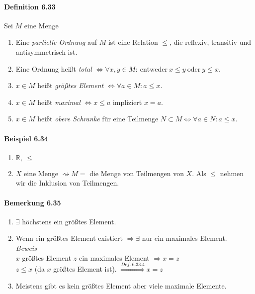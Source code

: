 \documentclass{scrartcl}
\begin{document}
\paragraph{Definition 6.33}
Sei $M$ eine Menge
\begin{enumerate}
\item Eine \textit{partielle Ordnung} auf $M$ ist eine Relation $\leq$, die reflexiv,
  transitiv und antisymmetrisch ist.
\item Eine Ordnung heißt \textit{total} $\Leftrightarrow \forall x,y \in M: ~
  \text{entweder} ~ x \leq y ~\text{oder}~ y \leq x$.
\item $x \in M$ heißt \textit{größtes Element} $\Leftrightarrow \forall a \in M:
  a \leq x$.
\item $x \in M$ heißt \textit{maximal} $\Leftrightarrow x \leq a$
  impliziert $x = a$.
\item $x \in M$ heißt \textit{obere Schranke} für eine Teilmenge $N \subset M
  \Leftrightarrow \forall a \in N: a \leq x$.
\end{enumerate}

\paragraph{Beispiel 6.34}
\begin{enumerate}
\item $\mathbb{R}, ~ \leq$
\item $X$ eine Menge $\rightsquigarrow M = $ die Menge von Teilmengen von $X$. Als
  $\leq$ nehmen wir die Inklusion von Teilmengen.
\end{enumerate}

\paragraph{Bemerkung 6.35}
\begin{enumerate}
\item $\exists$ höchstens ein größtes Element.
\item Wenn ein größtes Element existiert $\Rightarrow \exists$ nur ein maximales
  Element. \\
  \textit{Beweis} \\
  $x$ größtes Element $z$ ein maximales Element $\Rightarrow x = z$ \\
  $z \leq x$ (da $x$ größtes Element ist).
  $\overset{Def.~ 6.33.4}{\Rightarrow} x = z$
\item Meistens gibt es kein größtes Element aber viele maximale Elemente.
\end{enumerate}
\end{document}
